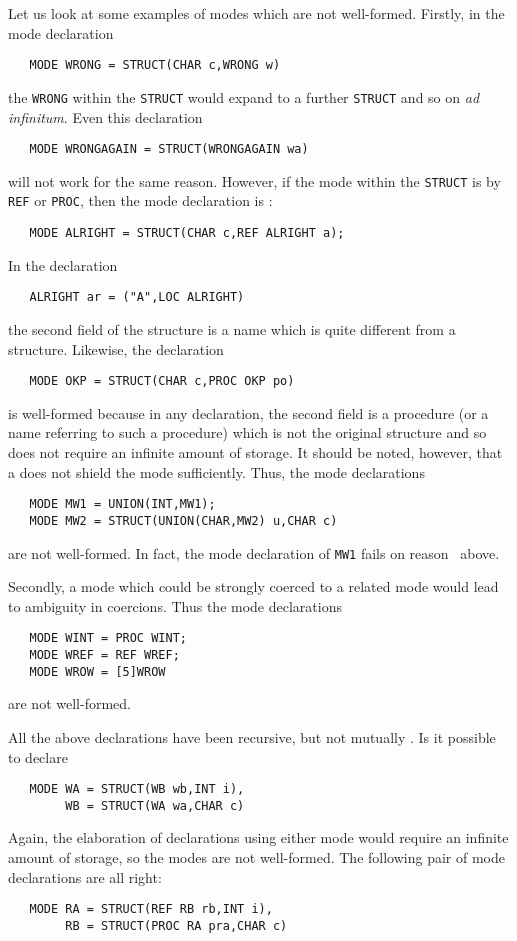 Let us look at some examples of modes which are not well-formed.
Firstly, in the mode declaration
\begin{verbatim}
   MODE WRONG = STRUCT(CHAR c,WRONG w)
\end{verbatim}
\noindent
the \verb|WRONG| within the \verb|STRUCT| would expand to a further
\verb|STRUCT| and so on \emph{ad infinitum}. Even this declaration
\begin{verbatim}
   MODE WRONGAGAIN = STRUCT(WRONGAGAIN wa)
\end{verbatim}
\noindent
will not work for the same reason. However, if the mode within the
\verb|STRUCT| is  by \verb|REF| or
\verb|PROC|, then the mode declaration is
:
\begin{verbatim}
   MODE ALRIGHT = STRUCT(CHAR c,REF ALRIGHT a);
\end{verbatim}
\noindent
In the declaration
\begin{verbatim}
   ALRIGHT ar = ("A",LOC ALRIGHT)
\end{verbatim}
\noindent
the second field of the structure is a name which is quite different
from a structure. Likewise, the declaration
\begin{verbatim}
   MODE OKP = STRUCT(CHAR c,PROC OKP po)
\end{verbatim}
\noindent
is well-formed because in any declaration, the second field is a
procedure (or a name referring to such a procedure) which is not the
original structure and so does not require an infinite amount of
storage. It should be noted, however, that a  does not
shield the mode sufficiently.  Thus, the mode declarations
\begin{verbatim}
   MODE MW1 = UNION(INT,MW1);
   MODE MW2 = STRUCT(UNION(CHAR,MW2) u,CHAR c)
\end{verbatim}
\noindent
are not well-formed. In fact, the mode declaration of \verb|MW1| fails
on reason~ above.

Secondly, a mode which could be strongly coerced to a related mode
would lead to ambiguity in coercions. Thus the mode declarations
\begin{verbatim}
   MODE WINT = PROC WINT;
   MODE WREF = REF WREF;
   MODE WROW = [5]WROW
\end{verbatim}
\noindent
are not well-formed.

All the above declarations have been recursive, but not mutually
. Is it possible to declare
\begin{verbatim}
   MODE WA = STRUCT(WB wb,INT i),
        WB = STRUCT(WA wa,CHAR c)
\end{verbatim}
\noindent
Again, the elaboration of declarations using either mode would
require an infinite amount of storage, so the modes are not
well-formed. The following pair of mode declarations are all right:
\begin{verbatim}
   MODE RA = STRUCT(REF RB rb,INT i),
        RB = STRUCT(PROC RA pra,CHAR c)
\end{verbatim}

